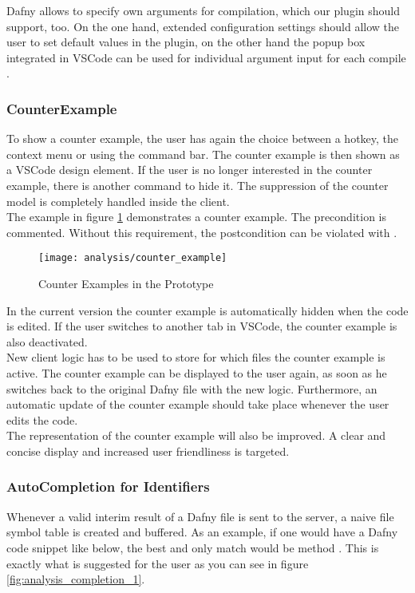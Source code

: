 Dafny allows to specify own arguments for compilation, which our plugin should support, too.
On the one hand, extended configuration settings should allow the user to set default values in the plugin, on the other hand the popup box integrated in VSCode can be used for individual argument input for each compile \cite{vscodeAPI}.

\subsubsection{CounterExample}
To show a counter example, the user has again the choice between a hotkey, the context menu or using the command bar.
The counter example is then shown as a VSCode design element.
If the user is no longer interested in the counter example, there is another command to hide it.
The suppression of the counter model is completely handled inside the client. \\

The example in figure \ref{fig:analysis_counter_example} demonstrates a counter example.
The precondition is commented. Without this requirement, the postcondition can be violated with .

\begin{figure}[H]
    \centering
    \texttt{[image: analysis/counter\_example]}
    \caption{Counter Examples in the Prototype}
    \label{fig:analysis_counter_example}
\end{figure}

In the current version the counter example is automatically hidden when the code is edited.
If the user switches to another tab in VSCode, the counter example is also deactivated. \\

New client logic has to be used to store for which files the counter example is active.
The counter example can be displayed to the user again, as soon as he switches back to the original Dafny file with the new logic.
Furthermore, an automatic update of the counter example should take place whenever the user edits the code.\\

The representation of the counter example will also be improved.
A clear and concise display and increased user friendliness is targeted.\\

\subsubsection{AutoCompletion for Identifiers}
Whenever a valid interim result of a Dafny file is sent to the server, a naive file symbol table is created and buffered.
As an example, if one would have a Dafny code snippet like below, the best and only match would be method .
This is exactly what is suggested for the user as you can see in figure \ref{fig:analysis_completion_1}.

